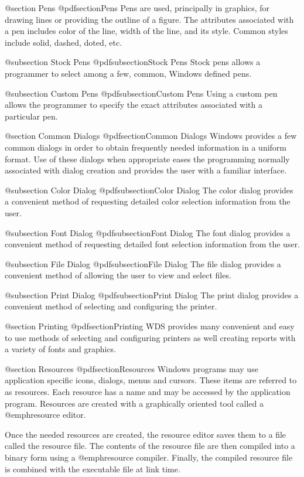 @section Pens
@pdfsection{Pens}
Pens are used, principally in graphics, for drawing lines or providing
the outline of a figure.  The attributes associated with a pen includes
color of the line, width of the line, and its style.  Common styles
include solid, dashed, doted, etc.

@subsection Stock Pens
@pdfsubsection{Stock Pens}
Stock pens allows a programmer to select among a few, common, Windows
defined pens.

@subsection Custom Pens
@pdfsubsection{Custom Pens}
Using a custom pen allows the programmer to specify the exact attributes
associated with a particular pen.

@section Common Dialogs
@pdfsection{Common Dialogs}
Windows provides a few common dialogs in order to obtain frequently
needed information in a uniform format.  Use of these dialogs when
appropriate eases the programming normally associated with dialog
creation and provides the user with a familiar interface.

@subsection Color Dialog
@pdfsubsection{Color Dialog}
The color dialog provides a convenient method of requesting detailed
color selection information from the user.

@subsection Font Dialog
@pdfsubsection{Font Dialog}
The font dialog provides a convenient method of requesting detailed
font selection information from the user.

@subsection File Dialog
@pdfsubsection{File Dialog}
The file dialog provides a convenient method of allowing the user to
view and select files.

@subsection Print Dialog
@pdfsubsection{Print Dialog}
The print dialog provides a convenient method of selecting and configuring
the printer.

@section Printing
@pdfsection{Printing}
WDS provides many convenient and easy to use methods of selecting and
configuring printers as well creating reports with a variety of fonts
and graphics.


@section Resources
@pdfsection{Resources}
Windows programs may use application specific icons, dialogs, menus and
cursors.  These items are referred to as resources.  Each resource has a
name and may be accessed by the application program.  Resources are
created with a graphically oriented tool called a @emph{resource editor}.

Once the needed resources are created, the resource editor saves them to
a file called the resource file.  The contents of the resource file are
then compiled into a binary form using a @emph{resource compiler}.
Finally, the compiled resource file is combined with the executable file
at link time.

